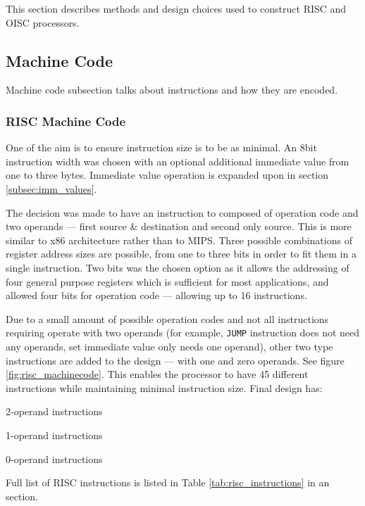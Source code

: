 This section describes methods and design choices used to construct RISC and OISC processors.

\subsection{Machine Code}\label{subsec:machine_code}
Machine code subsection talks about instructions and how they are encoded.

\subsubsection{RISC Machine Code}
One of the aim is to ensure instruction size is to be as minimal. An 8bit instruction width was chosen with an optional additional immediate value from one to three bytes. Immediate value operation is expanded upon in section \ref{subsec:imm_values}.

The decision was made to have an instruction to composed of operation code and two operands — first source \& destination and second only source. This is more similar to x86 architecture rather than to MIPS. Three possible combinations of register address sizes are possible, from one to three bits in order to fit them in a single instruction. Two bits was the chosen option as it allows the addressing of four general purpose registers which is sufficient for most applications, and allowed four bits for operation code — allowing up to 16 instructions. 

Due to a small amount of possible operation codes and not all instructions requiring operate with two operands (for example, \texttt{JUMP} instruction does not need any operands, set immediate value only needs one operand), other two type instructions are added to the design — with one and zero operands. See figure \ref{fig:risc_machinecode}. This enables the processor to have 45 different instructions while maintaining minimal instruction size. Final design has:
\begin{description}[labelindent=1cm, labelsep=1em]
	\item[$\bullet$ \textbf{8 }]  2-operand instructions
	\item[$\bullet$ \textbf{32}]  1-operand instructions
	\item[$\bullet$ \textbf{5 }]  0-operand instructions
\end{description}
Full list of RISC instructions is listed in Table \ref{tab:risc_instructions} in an  section.

